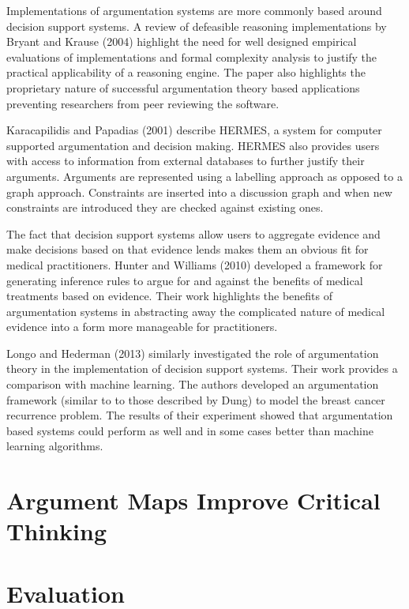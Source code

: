 Implementations of argumentation systems are more commonly based around decision support systems. A review of defeasible reasoning implementations by Bryant and Krause (2004) highlight the need for well designed empirical evaluations of implementations and formal complexity analysis to justify the practical applicability of a reasoning engine. The paper also highlights the proprietary nature of successful argumentation theory based applications preventing researchers from peer reviewing the software.

Karacapilidis and Papadias (2001) describe HERMES, a system for computer supported argumentation and decision making. HERMES also provides users with access to information from external databases to further justify their arguments. Arguments are represented using a labelling approach as opposed to a graph approach. Constraints are inserted into a discussion graph and when new constraints are introduced they are checked against existing ones.

The fact that decision support systems allow users to aggregate evidence and make decisions based on that evidence lends makes them an obvious fit for medical practitioners. Hunter and Williams (2010) developed a framework for generating inference rules to argue for and against the benefits of medical treatments based on evidence. Their work highlights the benefits of argumentation systems in abstracting away the complicated nature of medical evidence into a form more manageable for practitioners.

Longo and Hederman (2013) similarly investigated the role of argumentation theory in the implementation of decision support systems. Their work provides a comparison with machine learning. The authors developed an argumentation framework (similar to to those described by Dung) to model the breast cancer recurrence problem. The results of their experiment showed that argumentation based systems could perform as well and in some cases better than machine learning algorithms.


\section{Argument Maps Improve Critical Thinking}



\section{Evaluation}

